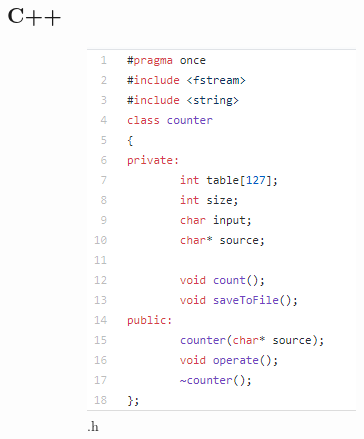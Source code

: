 \documentclass[]{article}
\begin{document}
\subsection{C++}
\begin{figure}[H]
	\centering
	\begin{subfigure}{.5\textwidth}
		\centering
		\includegraphics[width=0.8\linewidth]{h_code}
		\caption{.h}
		\label{fig:sub1}
	\end{subfigure}%
	\begin{subfigure}{.5\textwidth}
		\centering

\end{subfigure}
\end{figure}
\end{document}
